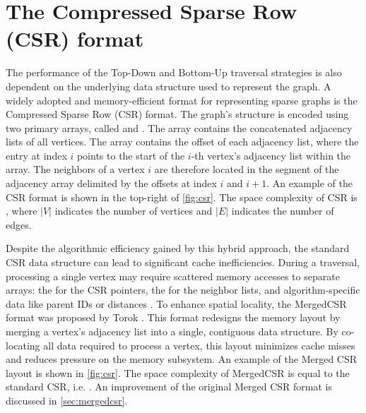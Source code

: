 \section{The Compressed Sparse Row (CSR) format}

The performance of the Top-Down and Bottom-Up traversal strategies is also dependent on the underlying data structure used to represent the graph. A widely adopted and memory-efficient format for representing sparse graphs is the Compressed Sparse Row (CSR) format. The graph's structure is encoded using two primary arrays, called \colidx{} and \rowptr{}. The \colidx{} array contains the concatenated adjacency lists of all vertices. The \rowptr{} array contains the offset of each adjacency list, where the entry at index $i$ points to the start of the $i$-th vertex's adjacency list within the \colidx{} array. The neighbors of a vertex $i$ are therefore located in the segment of the adjacency array delimited by the offsets at index $i$ and $i+1$. An example of the CSR format is shown in the top-right of \cref{fig:csr}. The space complexity of CSR is , where $|V|$ indicates the number of vertices and $|E|$ indicates the number of edges.

Despite the algorithmic efficiency gained by this hybrid approach, the standard CSR data structure can lead to significant cache inefficiencies. During a traversal, processing a single vertex may require scattered memory accesses to separate arrays: the \rowptr{} for the CSR pointers, the \colidx{} for the neighbor lists, and algorithm-specific data like parent IDs or distances \cite{torok2020improving, andaloro2025cache}. To enhance spatial locality, the MergedCSR format was proposed by Torok \cite{torok2020improving}. This format redesigns the memory layout by merging a vertex's adjacency list into a single, contiguous data structure. By co-locating all data required to process a vertex, this layout minimizes cache misses and reduces pressure on the memory subsystem. An example of the Merged CSR layout is shown in \cref{fig:csr}. The space complexity of MergedCSR is equal to the standard CSR, i.e. . An improvement of the original Merged CSR format is discussed in \cref{sec:mergedcsr}.

